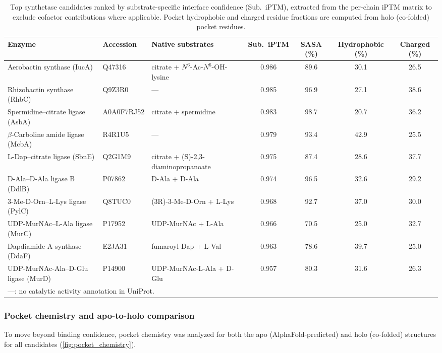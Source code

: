 \documentclass[12pt]{article}
\begin{document}
\begin{table}[H]
\centering
\caption{Top synthetase candidates ranked by substrate-specific interface confidence (Sub.~iPTM), extracted from the per-chain iPTM matrix to exclude cofactor contributions where applicable. Pocket hydrophobic and charged residue fractions are computed from holo (co-folded) pocket residues.}
\label{tab:top_synthetases}
\begin{adjustbox}{max width=\textwidth}
\begin{tabular}{lllcccc}
\hline
\textbf{Enzyme} & \textbf{Accession} & \textbf{Native substrates} & \textbf{Sub.~iPTM} & \textbf{SASA (\%)} & \textbf{Hydrophobic (\%)} & \textbf{Charged (\%)} \\
\hline
Aerobactin synthase (IucA) & Q47316 & citrate + $N^6$-Ac-$N^6$-OH-lysine & 0.986 & 89.6 & 30.1 & 26.5 \\
Rhizobactin synthase (RhbC) & Q9Z3R0 & --- & 0.985 & 96.9 & 27.1 & 38.6 \\
Spermidine--citrate ligase (AsbA) & A0A0F7RJ52 & citrate + spermidine & 0.983 & 98.7 & 20.7 & 36.2 \\
$\beta$-Carboline amide ligase (McbA) & R4R1U5 & --- & 0.979 & 93.4 & 42.9 & 25.5 \\
L-Dap--citrate ligase (SbnE) & Q2G1M9 & citrate + (S)-2,3-diaminopropanoate & 0.975 & 87.4 & 28.6 & 37.7 \\
D-Ala--D-Ala ligase B (DdlB) & P07862 & D-Ala + D-Ala & 0.974 & 96.5 & 32.6 & 29.2 \\
3-Me-D-Orn--L-Lys ligase (PylC) & Q8TUC0 & (3R)-3-Me-D-Orn + L-Lys & 0.968 & 92.7 & 37.0 & 30.0 \\
UDP-MurNAc--L-Ala ligase (MurC) & P17952 & UDP-MurNAc + L-Ala & 0.966 & 70.5 & 25.0 & 32.7 \\
Dapdiamide A synthase (DdaF) & E2JA31 & fumaroyl-Dap + L-Val & 0.963 & 78.6 & 39.7 & 25.0 \\
UDP-MurNAc-Ala--D-Glu ligase (MurD) & P14900 & UDP-MurNAc-L-Ala + D-Glu & 0.957 & 80.3 & 31.6 & 26.3 \\
\hline
\multicolumn{7}{l}{\footnotesize ---: no catalytic activity annotation in UniProt.} \\
\end{tabular}
\end{adjustbox}
\end{table}

\subsubsection{Pocket chemistry and apo-to-holo comparison}
\label{sec:pocket_chemistry}
To move beyond binding confidence, pocket chemistry was analyzed for both the apo (AlphaFold-predicted) and holo (co-folded) structures for all candidates (\autoref{fig:pocket_chemistry}). 
\end{document}
